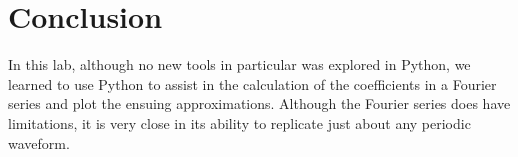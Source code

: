 \documentclass[11pt,a4,titlepage]{article}
\begin{document}
\section{Conclusion}
In this lab, although no new tools in particular was explored in Python, we learned to use Python to assist in the calculation of the coefficients in a Fourier series and plot the ensuing approximations. Although the Fourier series does have limitations, it is very close in its ability to replicate just about any periodic waveform.
\end{document}
